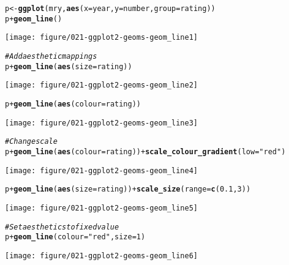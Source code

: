 \documentclass[a4paper,titlepage]{tufte-handout}\usepackage[]{graphicx}\usepackage[]{color}
\makeatletter
\def\maxwidth{ %
  \ifdim\Gin@nat@width>\linewidth
    \linewidth
  \else
    \Gin@nat@width
  \fi
}
\newcommand{\hlnum}[1]{\textcolor[rgb]{0.686,0.059,0.569}{#1}}%
\newcommand{\hlstr}[1]{\textcolor[rgb]{0.192,0.494,0.8}{#1}}%
\newcommand{\hlcom}[1]{\textcolor[rgb]{0.678,0.584,0.686}{\textit{#1}}}%
\newcommand{\hlopt}[1]{\textcolor[rgb]{0,0,0}{#1}}%
\newcommand{\hlstd}[1]{\textcolor[rgb]{0.345,0.345,0.345}{#1}}%
\newcommand{\hlkwb}[1]{\textcolor[rgb]{0.69,0.353,0.396}{#1}}%
\newcommand{\hlkwc}[1]{\textcolor[rgb]{0.333,0.667,0.333}{#1}}%
\newcommand{\hlkwd}[1]{\textcolor[rgb]{0.737,0.353,0.396}{\textbf{#1}}}%
\newenvironment{kframe}{%
 \def\at@end@of@kframe{}%
 \ifinner\ifhmode%
  \def\at@end@of@kframe{\end{minipage}}%
  \begin{minipage}{\columnwidth}%
 \fi\fi%
 \def\FrameCommand##1{\hskip\@totalleftmargin \hskip-\fboxsep
 \colorbox{shadecolor}{##1}\hskip-\fboxsep
     \hskip-\linewidth \hskip-\@totalleftmargin \hskip\columnwidth}%
 \MakeFramed {\advance\hsize-\width
   \@totalleftmargin\z@ \linewidth\hsize
   \@setminipage}}%
 {\par\unskip\endMakeFramed%
 \at@end@of@kframe}
\newenvironment{knitrout}{}{} %
\makeatother
\begin{document}
\begin{knitrout}
\begin{kframe}
\begin{alltt}
\hlstd{p} \hlkwb{<-} \hlkwd{ggplot}\hlstd{(mry,} \hlkwd{aes}\hlstd{(}\hlkwc{x}\hlstd{=year,} \hlkwc{y}\hlstd{=number,} \hlkwc{group}\hlstd{=rating))}
\hlstd{p} \hlopt{+} \hlkwd{geom_line}\hlstd{()}
\end{alltt}
\end{kframe}
\texttt{[image: figure/021-ggplot2-geoms-geom\_line1]} 
\begin{kframe}\begin{alltt}
\hlcom{# Add aesthetic mappings}
\hlstd{p} \hlopt{+} \hlkwd{geom_line}\hlstd{(}\hlkwd{aes}\hlstd{(}\hlkwc{size} \hlstd{= rating))}
\end{alltt}
\end{kframe}
\texttt{[image: figure/021-ggplot2-geoms-geom\_line2]} 
\begin{kframe}\begin{alltt}
\hlstd{p} \hlopt{+} \hlkwd{geom_line}\hlstd{(}\hlkwd{aes}\hlstd{(}\hlkwc{colour} \hlstd{= rating))}
\end{alltt}
\end{kframe}
\texttt{[image: figure/021-ggplot2-geoms-geom\_line3]} 
\begin{kframe}\begin{alltt}
\hlcom{# Change scale}
\hlstd{p} \hlopt{+} \hlkwd{geom_line}\hlstd{(}\hlkwd{aes}\hlstd{(}\hlkwc{colour} \hlstd{= rating))} \hlopt{+} \hlkwd{scale_colour_gradient}\hlstd{(}\hlkwc{low}\hlstd{=}\hlstr{"red"}\hlstd{)}
\end{alltt}
\end{kframe}
\texttt{[image: figure/021-ggplot2-geoms-geom\_line4]} 
\begin{kframe}\begin{alltt}
\hlstd{p} \hlopt{+} \hlkwd{geom_line}\hlstd{(}\hlkwd{aes}\hlstd{(}\hlkwc{size} \hlstd{= rating))} \hlopt{+} \hlkwd{scale_size}\hlstd{(}\hlkwc{range} \hlstd{=} \hlkwd{c}\hlstd{(}\hlnum{0.1}\hlstd{,} \hlnum{3}\hlstd{))}
\end{alltt}
\end{kframe}
\texttt{[image: figure/021-ggplot2-geoms-geom\_line5]} 
\begin{kframe}\begin{alltt}
\hlcom{# Set aesthetics to fixed value}
\hlstd{p} \hlopt{+} \hlkwd{geom_line}\hlstd{(}\hlkwc{colour} \hlstd{=} \hlstr{"red"}\hlstd{,} \hlkwc{size} \hlstd{=} \hlnum{1}\hlstd{)}
\end{alltt}
\end{kframe}
\texttt{[image: figure/021-ggplot2-geoms-geom\_line6]} 

\end{knitrout}
\end{document}
